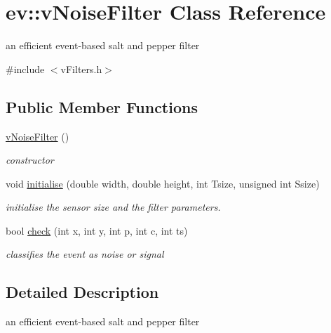 \hypertarget{classev_1_1vNoiseFilter}{}\section{ev\+:\+:v\+Noise\+Filter Class Reference}
\label{classev_1_1vNoiseFilter}


an efficient event-\/based salt and pepper filter  




{\ttfamily \#include $<$v\+Filters.\+h$>$}

\subsection*{Public Member Functions}
\begin{DoxyCompactItemize}
\item 
\mbox{\label{classev_1_1vNoiseFilter_a762260be3ee9eb0923fe08f906da975f}} 
\hyperlink{classev_1_1vNoiseFilter_a762260be3ee9eb0923fe08f906da975f}{v\+Noise\+Filter} ()
\begin{DoxyCompactList}\small\item\em constructor \end{DoxyCompactList}\item 
\mbox{\label{classev_1_1vNoiseFilter_af7c6cf000f7ed7193d160debac4e6879}} 
void \hyperlink{classev_1_1vNoiseFilter_af7c6cf000f7ed7193d160debac4e6879}{initialise} (double width, double height, int Tsize, unsigned int Ssize)
\begin{DoxyCompactList}\small\item\em initialise the sensor size and the filter parameters. \end{DoxyCompactList}\item 
bool \hyperlink{classev_1_1vNoiseFilter_a71ed5ded4f59d1c3180b0f5e5a021547}{check} (int x, int y, int p, int c, int ts)
\begin{DoxyCompactList}\small\item\em classifies the event as noise or signal \end{DoxyCompactList}\end{DoxyCompactItemize}


\subsection{Detailed Description}
an efficient event-\/based salt and pepper filter 

